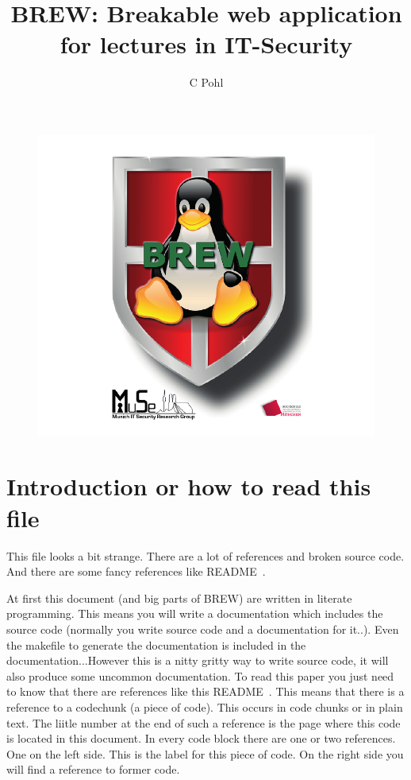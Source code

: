 \documentclass{llncs}%
\begin{document}
\title{BREW: Breakable web application for lectures in IT-Security}
\author{C Pohl 
\\ }
\maketitle

\begin{figure}
\centering
\includegraphics[width=1\textwidth]{logo}
\end{figure}
\section{Introduction or how to read this file}
This file looks a bit strange. There are a lot of references and broken source code. And there are some fancy references like {\Tt{}\LA{}README~{\nwtagstyle{}}\RA{}\nwendquote}.

At first this document (and big parts of BREW) are written in literate programming. This means you will write a documentation which includes the source code (normally you write source code and a documentation for it..). Even the makefile to generate the documentation is included in the documentation...However this is a nitty gritty way to write source code, it will also produce some uncommon documentation. To read this paper you just need to know that there are references like this {\Tt{}\LA{}README~{\nwtagstyle{}}\RA{}\nwendquote}. This means that there is a reference to a codechunk (a piece of code). This occurs in code chunks or in plain text. The liitle number at the end of such a reference is the page where this code is located in this document. In every code block there are one or two references. One on the left side. This is the label for this piece of code. On the right side you will find a reference to former code. 
\end{document}
